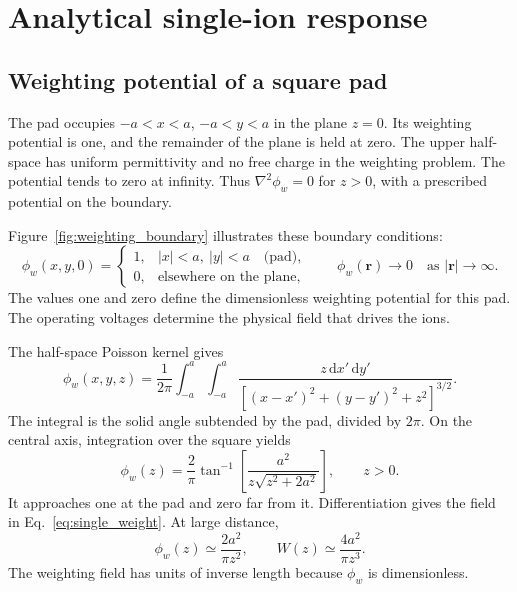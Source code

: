 \documentclass[11pt,a4paper]{article}
\newcommand{\dd}{\mathrm{d}}
\begin{document}
\clearpage
\appendix
\section{Analytical single-ion response}
\label{app:single_ion}

\subsection{Weighting potential of a square pad}

The pad occupies $-a<x<a$, $-a<y<a$ in the plane $z=0$. Its weighting potential is one, and the remainder of the plane is held at zero. The upper half-space has uniform permittivity and no free charge in the weighting problem. The potential tends to zero at infinity. Thus $\nabla^2\phi_w=0$ for $z>0$, with a prescribed potential on the boundary.

Figure~\ref{fig:weighting_boundary} illustrates these boundary conditions:
\begin{equation}
 \phi_w(x,y,0)=
 \begin{cases}
  1, & |x|<a,\ |y|<a \quad \text{(pad)},\\
  0, & \text{elsewhere on the plane},
 \end{cases}
 \qquad
 \phi_w(\mathbf r)\longrightarrow0
 \quad\text{as }|\mathbf r|\longrightarrow\infty.
 \label{eq:weighting_boundary}
\end{equation}
The values one and zero define the dimensionless weighting potential for this
pad. The operating voltages determine the physical field that drives the ions.

The half-space Poisson kernel gives~\cite{salazar2021}
\begin{equation}
 \phi_w(x,y,z)=\frac{1}{2\pi}\int_{-a}^{a}\int_{-a}^{a}
 \frac{z\,\dd x'\,\dd y'}{[(x-x')^2+(y-y')^2+z^2]^{3/2}}.
 \label{eq:app_poisson}
\end{equation}
The integral is the solid angle subtended by the pad, divided by $2\pi$. On the central axis, integration over the square yields
\begin{equation}
 \phi_w(z)=\frac{2}{\pi}\tan^{-1}
 \left[\frac{a^2}{z\sqrt{z^2+2a^2}}\right],\qquad z>0.
 \label{eq:app_square_phi}
\end{equation}
It approaches one at the pad and zero far from it. Differentiation gives the field in Eq.~\eqref{eq:single_weight}. At large distance,
\begin{equation}
 \phi_w(z)\simeq\frac{2a^2}{\pi z^2},\qquad
 W(z)\simeq\frac{4a^2}{\pi z^3}.
\end{equation}
The weighting field has units of inverse length because $\phi_w$ is dimensionless.
\end{document}
